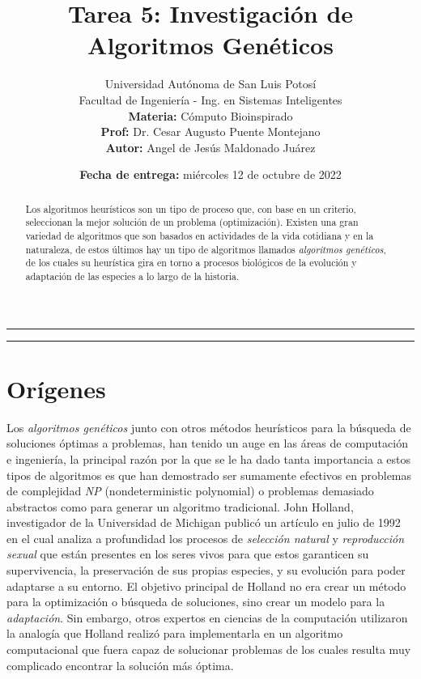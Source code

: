 \documentclass[a4paper, 12pt]{article}
\title{\vspace{-3cm}Tarea 5: Investigación de Algoritmos Genéticos}
\author{
    Universidad Autónoma de San Luis Potosí\\ 
    Facultad de Ingeniería - Ing. en Sistemas Inteligentes\\ 
    \textbf{Materia:} Cómputo Bioinspirado \\
    \textbf{Prof:} Dr. Cesar Augusto Puente Montejano  \\
    \textbf{Autor:} Angel de Jesús Maldonado Juárez
}
\date{\textbf{Fecha de entrega:} miércoles 12 de octubre de 2022}
\begin{document}
\maketitle

\begin{center}
    \rule{\textwidth}{0.5pt}
    \begin{abstract}
        Los algoritmos heurísticos son un tipo de proceso que, con base en un criterio, seleccionan la mejor solución de un problema (optimización). Existen una gran variedad de algoritmos que son basados en actividades de la vida cotidiana y en la naturaleza, de estos últimos hay un tipo de algoritmos llamados \emph{algoritmos genéticos}, de los cuales su heurística gira en torno a procesos biológicos de la evolución y adaptación de las especies a lo largo de la historia.
    \end{abstract}
    \rule{\textwidth}{0.5pt}
\end{center}

\section{Orígenes}
Los \emph{algoritmos genéticos} junto con otros métodos heurísticos para la búsqueda de soluciones óptimas a problemas, han tenido un auge en las áreas de computación e ingeniería, la principal razón por la que se le ha dado tanta importancia a estos tipos de algoritmos es que han demostrado ser sumamente efectivos en problemas de complejidad \emph{NP} (nondeterministic polynomial) o problemas demasiado abstractos como para generar un algoritmo tradicional.
John Holland, investigador de la Universidad de Michigan publicó un artículo en julio de 1992 en el cual analiza a profundidad los procesos de \emph{selección natural} y \emph{reproducción sexual} que están presentes en los seres vivos para que estos garanticen su supervivencia, la preservación de sus propias especies, y su evolución para poder adaptarse a su entorno. El objetivo principal de Holland no era crear un método para la optimización o búsqueda de soluciones, sino crear un modelo para la \emph{adaptación}. Sin embargo, otros expertos en ciencias de la computación utilizaron la analogía que Holland realizó para implementarla en un algoritmo computacional que fuera capaz de solucionar problemas de los cuales resulta muy complicado encontrar la solución más óptima.
\end{document}
